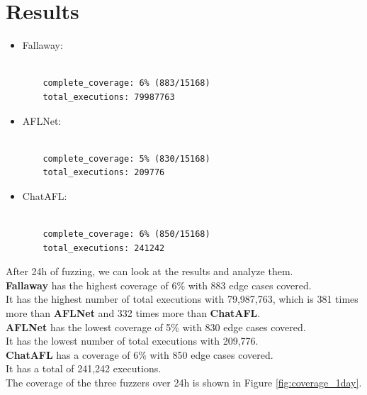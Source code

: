 \chapter{Results}
\label{chap:Results}

\begin{itemize}
    \item Fallaway:
    \begin{lstlisting}

    complete_coverage: 6% (883/15168)
    total_executions: 79987763
    \end{lstlisting}
    
    \item AFLNet:
    \begin{lstlisting}
    
    complete_coverage: 5% (830/15168)
    total_executions: 209776
    \end{lstlisting}
    
    \item ChatAFL:
    \begin{lstlisting}
    
    complete_coverage: 6% (850/15168)
    total_executions: 241242
    \end{lstlisting}
\end{itemize}
After 24h of fuzzing, we can look at the results and analyze them.
\\\textbf{Fallaway} has the highest coverage of 6\% with 883 edge cases covered.
\\It has the highest number of total executions with 79,987,763, which is 381 times more than \textbf{AFLNet} and 332 times more than \textbf{ChatAFL}.
\\\textbf{AFLNet} has the lowest coverage of 5\% with 830 edge cases covered.
\\It has the lowest number of total executions with 209,776.
\\\textbf{ChatAFL} has a coverage of 6\% with 850 edge cases covered.
\\It has a total of 241,242 executions.
\\The coverage of the three fuzzers over 24h is shown in Figure \ref{fig:coverage_1day}.

